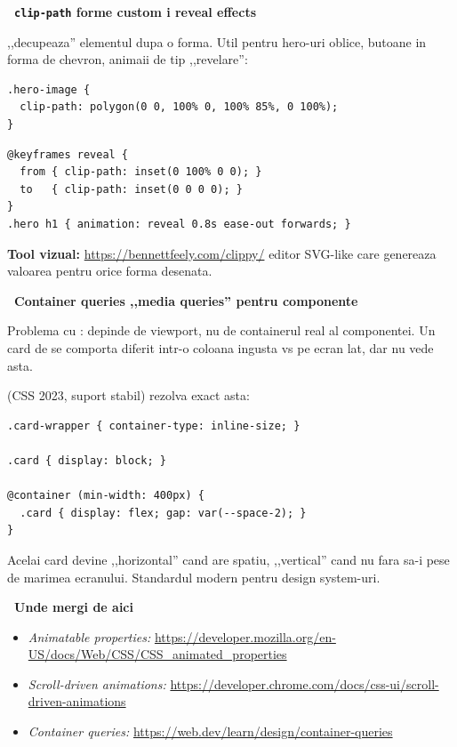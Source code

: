 \begin{bonusbox}
\medskip

\textbf{\faCut\ \texttt{clip-path} \textendash{} forme custom i reveal effects}

 ,,decupeaza'' elementul dupa o forma. Util pentru hero-uri oblice, butoane in forma de chevron, animaii de tip ,,revelare'':

\begin{lstlisting}[style=css, caption={Imagine cu margine diagonala}]
.hero-image {
  clip-path: polygon(0 0, 100% 0, 100% 85%, 0 100%);
}
\end{lstlisting}

\begin{lstlisting}[style=css, caption={Reveal animat: pagina se ,,deschide'' la load}]
@keyframes reveal {
  from { clip-path: inset(0 100% 0 0); }
  to   { clip-path: inset(0 0 0 0); }
}
.hero h1 { animation: reveal 0.8s ease-out forwards; }
\end{lstlisting}

\begin{ponturi}
\textbf{Tool vizual:} \url{https://bennettfeely.com/clippy/} \textendash{} editor SVG-like care genereaza valoarea  pentru orice forma desenata.
\end{ponturi}

\medskip

\textbf{\faMobile*\ Container queries \textendash{} ,,media queries'' pentru componente}

Problema cu : depinde de viewport, nu de containerul real al componentei. Un card de \code{300px} se comporta diferit intr-o coloana ingusta vs pe ecran lat, dar  nu vede asta.

 (CSS 2023, suport stabil) rezolva exact asta:

\begin{lstlisting}[style=css, caption={Card responsive in functie de container, nu de viewport}]
.card-wrapper { container-type: inline-size; }

.card { display: block; }

@container (min-width: 400px) {
  .card { display: flex; gap: var(--space-2); }
}
\end{lstlisting}

Acelai card devine ,,horizontal'' cand are spatiu, ,,vertical'' cand nu \textendash{} fara sa-i pese de marimea ecranului. Standardul modern pentru design system-uri.

\medskip

\textbf{\faRoute\ Unde mergi de aici}

\begin{itemize}[itemsep=1pt]
  \item \emph{Animatable properties:} \url{https://developer.mozilla.org/en-US/docs/Web/CSS/CSS_animated_properties}
  \item \emph{Scroll-driven animations:} \url{https://developer.chrome.com/docs/css-ui/scroll-driven-animations}
  \item \emph{Container queries:} \url{https://web.dev/learn/design/container-queries}
\end{itemize}
\end{bonusbox}

